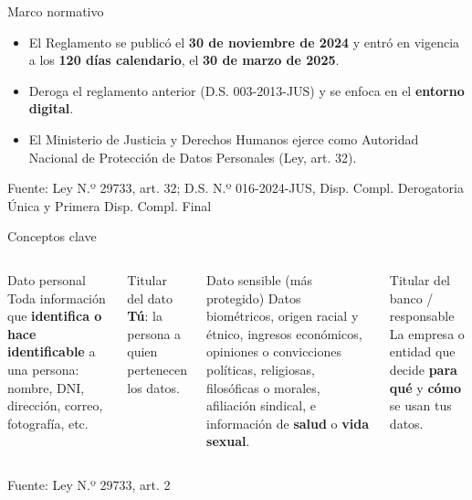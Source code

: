 \documentclass[aspectratio=169,11pt]{beamer}
\newcommand{\fuente}[1]{\par\vfill\hfill{\tiny\color{gray}Fuente: #1}}
\begin{document}
\begin{frame}{Marco normativo}
\begin{center}
\end{center}
\begin{itemize}\small
  \item El Reglamento se publicó el \textbf{30 de noviembre de 2024} y entró en vigencia a los \textbf{120 días calendario}, el \textbf{30 de marzo de 2025}.
  \item \alert{Deroga} el reglamento anterior (D.S. 003-2013-JUS) y se enfoca en el \textbf{entorno digital}.
  \item El Ministerio de Justicia y Derechos Humanos ejerce como Autoridad Nacional de Protección de Datos Personales (Ley, art. 32).
\end{itemize}
\fuente{Ley N.º 29733, art. 32; D.S. N.º 016-2024-JUS, Disp. Compl. Derogatoria Única y Primera Disp. Compl. Final}
\end{frame}

\begin{frame}{Conceptos clave}
\begin{columns}[T]
\begin{block}{Dato personal}
Toda información que \textbf{identifica o hace identificable} a una persona: nombre, DNI, dirección, correo, fotografía, etc.
\end{block}
\begin{block}{Titular del dato}
\textbf{Tú}: la persona a quien pertenecen los datos.
\end{block}
\begin{block}{Dato sensible (más protegido)}
\small Datos biométricos, origen racial y étnico, ingresos económicos, opiniones o convicciones políticas, religiosas, filosóficas o morales, afiliación sindical, e información de \textbf{salud} o \textbf{vida sexual}.
\end{block}
\begin{block}{Titular del banco / responsable}
\small La empresa o entidad que decide \textbf{para qué} y \textbf{cómo} se usan tus datos.
\end{block}
\end{columns}
\fuente{Ley N.º 29733, art. 2}
\end{frame}
\end{document}
